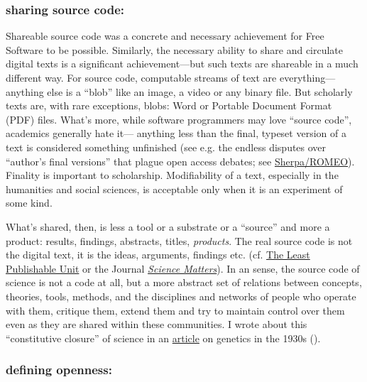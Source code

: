\documentclass[11pt]{article}
\begin{document}
\subsubsection*{\textbf{sharing source code}:}
\label{sec:org62dfbf7}
Shareable source code was a concrete and necessary achievement for Free Software to be possible.  Similarly, the necessary ability to share and circulate digital texts is a significant achievement---but such texts are shareable in a much different way.  For source code, computable streams of text are everything---anything else is a ``blob'' like an image, a video or any binary file. But scholarly texts are, with rare exceptions, blobs: Word or Portable Document Format (PDF) files.   What's more, while software programmers may love ``source code'', academics generally hate it--- anything less than the final, typeset version of a text is considered something unfinished (see e.g. the endless disputes over ``author's final versions'' that plague open access debates; see \href{http://www.sherpa.ac.uk/romeo/index.php}{Sherpa/ROMEO}).  Finality is important to scholarship.  Modifiability of a text, especially in the humanities and social sciences, is acceptable only when it is an experiment of some kind.

What's shared, then, is less a tool or a substrate or a ``source'' and more a product: results, findings, abstracts, titles, \emph{products}.   The real source code is not the digital text, it is the ideas, arguments, findings etc.  (cf. \href{https://en.wikipedia.org/wiki/Least\_publishable\_unit}{The Least Publishable Unit} or the Journal \emph{\href{https://www.sciencematters.io/why-matters}{Science Matters}}).  In an sense, the source code of science is not a code at all, but a more abstract set of relations between concepts, theories, tools, methods, and the disciplines and networks of people who operate with them, critique them, extend them and try to maintain control over them even as they are shared within these communities.  I wrote about this ``constitutive closure'' of science in an \href{https://kelty.org/or/papers/Kelty-biosoc20128a.pdf}{article} on genetics in the 1930s (\cite{kelty2012not}).

\subsubsection*{\textbf{defining openness}:}
\label{sec:org1a4eb13}
\end{document}
